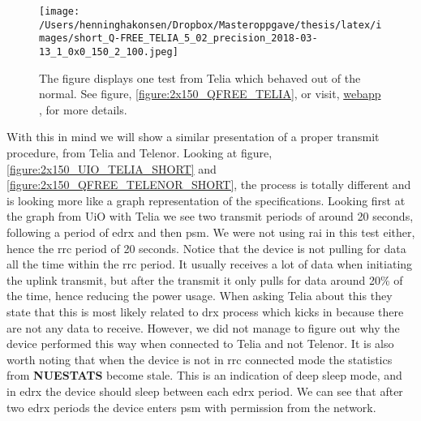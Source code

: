 \documentclass[USenglish]{ifimaster}  %
\begin{document}
\begin{figure}[H]
  \centering
  \texttt{[image: /Users/henninghakonsen/Dropbox/Masteroppgave/thesis/latex/images/short\_Q-FREE\_TELIA\_5\_02\_precision\_2018-03-13\_1\_0x0\_150\_2\_100.jpeg]}
  \caption[Short-term test - unusual behavior, Telia]{The figure displays one test from Telia which behaved out of the normal. See figure, \vref{figure:2x150_QFREE_TELIA}, or visit, \href{http://158.39.77.97:9000/\#/results/Q-FREE\_TELIA\_5.02\_precision\_2018-03-13\_1\_0x0\_150\_2\_100}{webapp} \cite{online:result0}, for more details.}
  \label{figure:2x150_QFREE_TELIA_SHORT}
\end{figure}

With this in mind we will show a similar presentation of a proper transmit procedure, from Telia and Telenor. Looking at figure, \vref{figure:2x150_UIO_TELIA_SHORT} and \vref{figure:2x150_QFREE_TELENOR_SHORT}, the process is totally different and is looking more like a graph representation of the specifications. Looking first at the graph from UiO with Telia we see two transmit periods of around 20 seconds, following a period of \acrshort{edrx} and then \acrshort{psm}. We were not using \acrshort{rai} in this test either, hence the \acrshort{rrc} period of 20 seconds. Notice that the device is not pulling for data all the time within the \acrshort{rrc} period. It usually receives a lot of data when initiating the uplink transmit, but after the transmit it only pulls for data around 20\% of the time, hence reducing the power usage. When asking Telia about this they state that this is most likely related to \acrshort{drx} process which kicks in because there are not any data to receive\cite{email:telia}. However, we did not manage to figure out why the device performed this way when connected to Telia and not Telenor.
It is also worth noting that when the device is not in \acrshort{rrc} connected mode the statistics from \textbf{NUESTATS} become stale. This is an indication of deep sleep mode, and in \acrshort{edrx} the device should sleep between each \acrshort{edrx} period. We can see that after two \acrshort{edrx} periods the device enters \acrshort{psm} with permission from the network.
\end{document}
